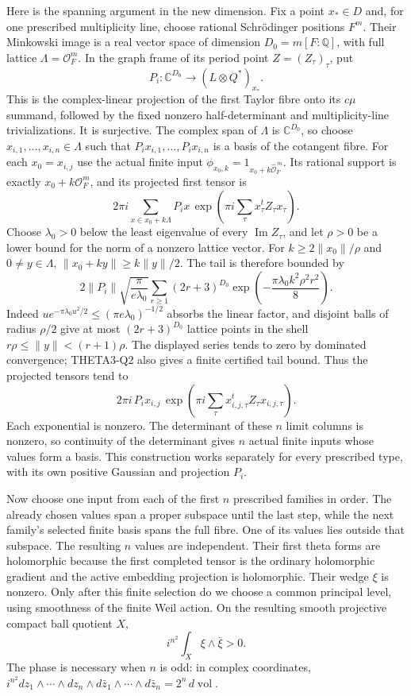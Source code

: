 \documentclass[11pt]{article}
\newcommand{\Q}{\mathbb Q}\newcommand{\C}{\mathbb C}\newcommand{\Z}{\mathbb Z}\newcommand{\R}{\mathbb R}\newcommand{\A}{\mathbb A}\newcommand{\OO}{\mathcal O}
\theoremstyle{definition}\newtheorem{definition}[theorem]{Definition}\newtheorem{remark}[theorem]{Remark}
\begin{document}
Here is the spanning argument in the new dimension. Fix a point
$x_*\in D$ and, for one prescribed multiplicity line, choose rational
Schr\"odinger positions $F^m$. Their Minkowski image is a real vector
space of dimension $D_0=m[F:\Q]$, with full lattice
$\Lambda=\OO_F^m$. In the graph frame of its period point
$Z=(Z_\tau)_\tau$, put
\[
 P_i:\C^{D_0}\longrightarrow
       (L\otimes Q^*)_{x_*}.
\]
This is the complex-linear projection of the first Taylor fibre
onto its $c\mu$ summand, followed by the fixed nonzero
half-determinant and multiplicity-line trivializations. It is
surjective. The complex span of $\Lambda$ is $\C^{D_0}$, so choose
$x_{i,1},\ldots,x_{i,n}\in\Lambda$ such that
$P_i x_{i,1},\ldots,P_i x_{i,n}$ is a basis of the cotangent fibre.
For each $x_0=x_{i,j}$ use the actual finite input
$\phi_{x_0,k}=1_{x_0+k\widehat{\OO}_F^{\,m}}$. Its rational
support is exactly $x_0+k\OO_F^m$, and its projected first tensor is
\[
 2\pi i\sum_{x\in x_0+k\Lambda}
       P_i x\,
       \exp\left(\pi i\sum_\tau x_\tau^tZ_\tau x_\tau\right).
\]
Choose $\lambda_0>0$ below the least eigenvalue of every
$\operatorname{Im}Z_\tau$, and let $\rho>0$ be a lower bound for
the norm of a nonzero lattice vector. For
$k\geq2\|x_0\|/\rho$ and $0\ne y\in\Lambda$,
$\|x_0+ky\|\geq k\|y\|/2$. The tail is therefore bounded by
\[
 2\|P_i\|\sqrt{\frac{\pi}{e\lambda_0}}
   \sum_{r\geq1}(2r+3)^{D_0}
      \exp\left(-\frac{\pi\lambda_0 k^2\rho^2 r^2}{8}\right).
\]
Indeed $u e^{-\pi\lambda_0u^2/2}\leq
(\pi e\lambda_0)^{-1/2}$ absorbs the linear factor, and disjoint
balls of radius $\rho/2$ give at most $(2r+3)^{D_0}$ lattice
points in the shell $r\rho\leq\|y\|<(r+1)\rho$.
The displayed series tends to zero by dominated convergence;
THETA3-Q2 also gives a finite certified tail bound. Thus the
projected tensors tend to
\[
 2\pi i\,P_i x_{i,j}\,
 \exp\left(\pi i\sum_\tau
              x_{i,j,\tau}^tZ_\tau x_{i,j,\tau}\right).
\]
Each exponential is nonzero. The determinant of these $n$ limit
columns is nonzero, so continuity of the determinant gives $n$
actual finite inputs whose values form a basis. This construction
works separately for every prescribed type, with its own positive
Gaussian and projection $P_i$.

Now choose one input from each of the first $n$ prescribed families
in order. The already chosen values span a proper subspace until
the last step, while the next family's selected finite basis spans
the full fibre. One of its values lies outside that subspace.
The resulting $n$ values are independent. Their first theta forms
are holomorphic because the first completed tensor is the ordinary
holomorphic gradient and the active embedding projection is
holomorphic. Their wedge $\xi$ is nonzero. Only after this finite
selection do we choose a common principal level, using smoothness
of the finite Weil action. On the resulting smooth projective
compact ball quotient $X$,
\begin{equation}\label{A6-positive}
 i^{n^2}\int_X\xi\wedge\bar\xi>0.
\end{equation}
The phase is necessary when $n$ is odd: in complex coordinates,
$i^{n^2}dz_1\wedge\cdots\wedge dz_n\wedge
d\bar z_1\wedge\cdots\wedge d\bar z_n=2^n\,d\operatorname{vol}$.
\end{document}
